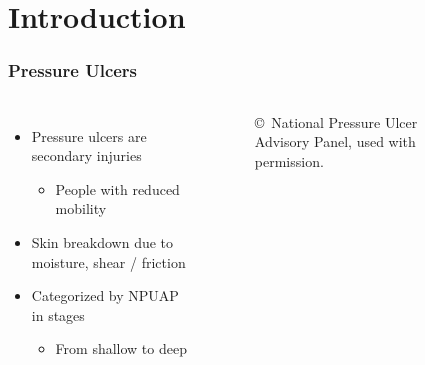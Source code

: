 \documentclass{beamer}
\begin{document}
	\section{Introduction}
		\setcounter{framenumber}{0}
		\begin{frame}
			\frametitle{Pressure Ulcers}
			\begin{columns}[c]
				\begin{itemize}
					\item Pressure ulcers are secondary injuries
					\begin{itemize}
						\item People with reduced mobility
					\end{itemize}

					\item Skin breakdown due to moisture, shear / friction

					\item Categorized by NPUAP in stages
					\begin{itemize}
						\item From shallow to deep
					\end{itemize}
				\end{itemize}

					\begin{figure}
						\centering
%
%

						\caption{\copyright\ National Pressure Ulcer Advisory Panel, used with permission.}
					\end{figure}
			\end{columns}
		\end{frame}
\end{document}
